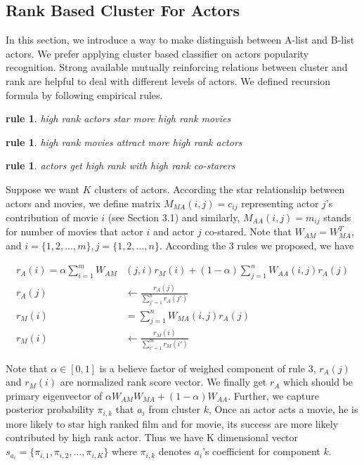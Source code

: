 \subsection{Rank Based Cluster For Actors}
In this section, we introduce a way to make distinguish between A-list and B-list actors. We prefer applying cluster based classifier on actors popularity recognition. Strong available mutually reinforcing relations between cluster and rank are helpful to deal with different levels of actors. We defined recursion formula by following empirical rules.
\newtheorem{rules}[theorem]{rule}
\begin{rules} high rank actors star more high rank movies\end{rules}
\begin{rules} high rank movies attract more high rank actors\end{rules}
\begin{rules} actors get high rank with high rank co-starers\end{rules}

Suppose we want $K$ clusters of actors. According the star relationship between actors and movies, we define matrix $M_{MA}(i, j)=c_{ij}$ representing actor $j$'s contribution of movie $i$ (see Section 3.1) and similarly, $M_{AA}(i, j)= m_{ij}$ stands for number of movies that actor $i$ and actor $j$ co-stared. Note that $W_{AM} = W_{MA}^T$, and $i=\{1,2,\dots, m\}, j=\{1,2,\dots, n\}$. According the 3 rules we proposed, we have

\begin{subequations}
\begin{align}
  r_{A}(i) = \alpha \sum_{i=1}^{m}W_{AM}&(j, i)r_M(i) + (1-\alpha)\sum_{j=1}^{n}W_{AA}(i, j)r_A(j)\\
  r_{A}(j) &\leftarrow \frac{r_{A}(j)}{\sum_{j'=1}^{n}r_{A}(j')}\\
  r_{M}(i) &= \sum_{j=1}^{n}W_{MA}(i, j)r_A(j)\\
  r_{M}(i) &\leftarrow \frac{r_{M}(i)}{\sum_{i'=1}^{m}r_{M}(i')}
\end{align}
\end{subequations}

Note that $\alpha \in [0,1]$ is a believe factor of weighed component of rule 3,  $r_{A}(j)$ and $r_{M}(i)$ are normalized rank score vector. We finally get $r_A$ which should be primary eigenvector of $\alpha W_{AM}W_{MA} + (1-\alpha) W_{AA}$. Further, we capture posterior probability $\pi_{i,k}$ that $a_i$ from cluster $k$, Once an actor acts a movie, he is more likely to star high ranked film and for movie, its success are more likely contributed by high rank actor. Thus we have K dimensional vector $s_{a_i} = \{\pi_{i,1}, \pi_{i,2}, \dots, \pi_{i,K}\}$ where $\pi_{i,k}$ denotes $a_i$'s coefficient for component $k$.

